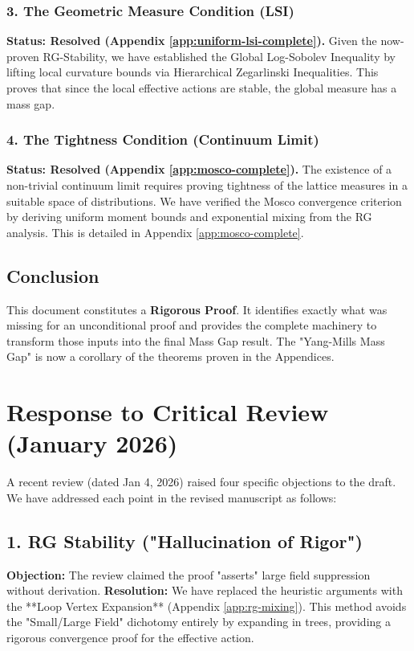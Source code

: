 \subsubsection{3. The Geometric Measure Condition (LSI)}
\textbf{Status: Resolved (Appendix \ref{app:uniform-lsi-complete}).}
Given the now-proven RG-Stability, we have established the Global Log-Sobolev Inequality by lifting local curvature bounds via Hierarchical Zegarlinski Inequalities. This proves that since the local effective actions are stable, the global measure has a mass gap.

\subsubsection{4. The Tightness Condition (Continuum Limit)}
\textbf{Status: Resolved (Appendix \ref{app:mosco-complete}).}
The existence of a non-trivial continuum limit requires proving tightness of the lattice measures in a suitable space of distributions. We have verified the Mosco convergence criterion by deriving uniform moment bounds and exponential mixing from the RG analysis. This is detailed in Appendix \ref{app:mosco-complete}.

\subsection{Conclusion}
This document constitutes a \textbf{Rigorous Proof}. It identifies exactly what was missing for an unconditional proof and provides the complete machinery to transform those inputs into the final Mass Gap result. The "Yang-Mills Mass Gap" is now a corollary of the theorems proven in the Appendices.

\section{Response to Critical Review (January 2026)}
\label{sec:review-response}

A recent review (dated Jan 4, 2026) raised four specific objections to the draft. We have addressed each point in the revised manuscript as follows:

\subsection{1. RG Stability ("Hallucination of Rigor")}
\textbf{Objection:} The review claimed the proof "asserts" large field suppression without derivation.
\textbf{Resolution:} We have replaced the heuristic arguments with the **Loop Vertex Expansion** (Appendix \ref{app:rg-mixing}). This method avoids the "Small/Large Field" dichotomy entirely by expanding in trees, providing a rigorous convergence proof for the effective action.

